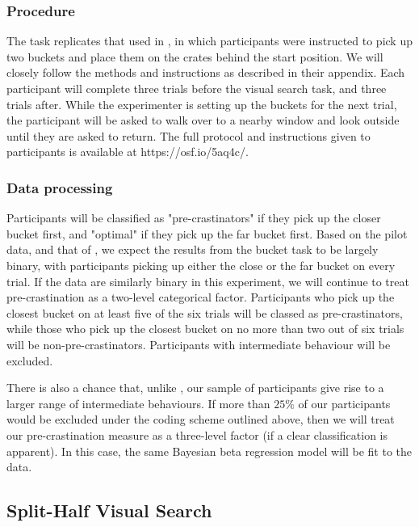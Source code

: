 \documentclass[]{rsos}
\begin{document}
\subsubsection{Procedure}

The task replicates that used in \cite{fournier2019task}, in which participants were instructed to pick up two buckets and place them on the crates behind the start position. We will closely follow the methods and instructions as described in their appendix. Each participant will complete three trials before the visual search task, and three trials after. While the experimenter is setting up the buckets for the next trial, the participant will be asked to walk over to a nearby window and look outside until they are asked to return. The full protocol and instructions given to participants is available at https://osf.io/5aq4c/. 

\subsubsection{Data processing}

Participants will be classified as "pre-crastinators" if they pick up the closer bucket first, and "optimal" if they pick up the far bucket first. Based on the pilot data, and that of \cite{fournier2019task}, we expect the results from the bucket task to be largely binary, with participants picking up either the close or the far bucket on every trial. If the data are similarly binary in this experiment, we will continue to treat pre-crastination as a two-level categorical factor. Participants who pick up the closest bucket on at least five of the six trials will be classed as pre-crastinators, while those who pick up the closest bucket on no more than two out of six trials will be non-pre-crastinators. Participants with intermediate behaviour will be excluded. 

There is also a chance that, unlike \cite{fournier2019task}, our sample of participants give rise to a larger range of intermediate behaviours. If more than $25\%$ of our participants would be excluded under the coding scheme outlined above, then we will treat our pre-crastination measure as a three-level factor (if a clear classification is apparent). In this case, the same Bayesian beta regression model will be fit to the data. 

\subsection{Split-Half Visual Search}
\end{document}
